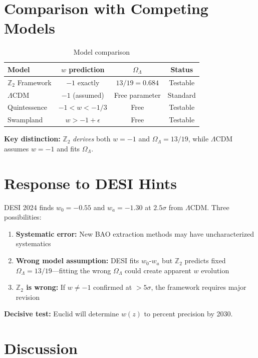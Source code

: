 \documentclass[12pt,a4paper]{article}
\begin{document}
\section{Comparison with Competing Models}

\begin{table}[h]
\centering
\begin{tabular}{lccc}
\toprule
Model & $w$ prediction & $\Omega_\Lambda$ & Status \\
\midrule
$\mathbb{Z}_2$ Framework & $-1$ exactly & $13/19 = 0.684$ & Testable \\
$\Lambda$CDM & $-1$ (assumed) & Free parameter & Standard \\
Quintessence & $-1 < w < -1/3$ & Free & Testable \\
Swampland & $w > -1 + \epsilon$ & Free & Testable \\
\bottomrule
\end{tabular}
\caption{Model comparison}
\end{table}

\textbf{Key distinction:} $\mathbb{Z}_2$ \textit{derives} both $w = -1$ and $\Omega_\Lambda = 13/19$, while $\Lambda$CDM assumes $w = -1$ and fits $\Omega_\Lambda$.

\section{Response to DESI Hints}

DESI 2024 finds $w_0 = -0.55$ and $w_a = -1.30$ at $2.5\sigma$ from $\Lambda$CDM. Three possibilities:

\begin{enumerate}
    \item \textbf{Systematic error:} New BAO extraction methods may have uncharacterized systematics
    \item \textbf{Wrong model assumption:} DESI fits $w_0$-$w_a$ but $\mathbb{Z}_2$ predicts fixed $\Omega_\Lambda = 13/19$---fitting the wrong $\Omega_\Lambda$ could create apparent $w$ evolution
    \item \textbf{$\mathbb{Z}_2$ is wrong:} If $w \neq -1$ confirmed at $>5\sigma$, the framework requires major revision
\end{enumerate}

\textbf{Decisive test:} Euclid will determine $w(z)$ to percent precision by 2030.

\section{Discussion}
\end{document}
